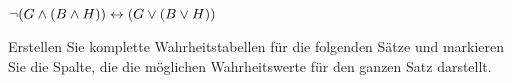 \begin{earg}
\item $\neg(G \wedge (B \wedge H)) \leftrightarrow (G \vee (B \vee H))$
%


\end{earg}

\problempart
Erstellen Sie komplette Wahrheitstabellen für die folgenden Sätze und markieren Sie die Spalte, die die möglichen Wahrheitswerte für den ganzen Satz darstellt.

